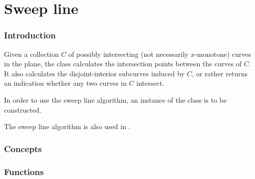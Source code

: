 \chapter{Sweep line}

\subsection*{Introduction}

Given a collection $C$ of possibly intersecting 
(not necessarily $x$-monotone) curves in the plane, 
the  class calculates the intersection points between 
the curves of $C$. It also calculates the disjoint-interior subcurves
induced by $C$, or rather returns an indication whether any two curves in 
$C$ intersect.

In order to use the sweep line algorithm, an instance of the 
 class is to be constructed. 

The sweep line algorithm is also used in 
. 

\begin{ccTexOnly}

\subsection*{Concepts}

\subsection*{Functions}

\end{ccTexOnly}    

